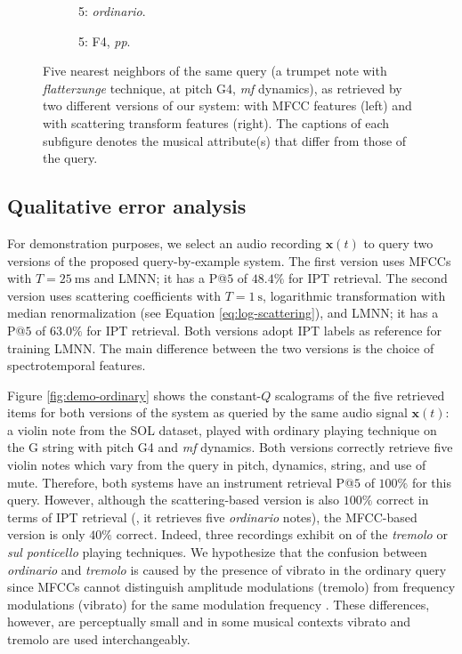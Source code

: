 \begin{figure}
        \begin{subfigure}{0.20\textwidth}
                \centering
                \caption*{5: \emph{ordinario}.}
                \label{fig:TpC-ord-G4-mf}
        \end{subfigure}%
        \begin{subfigure}{0.20\textwidth}
                \centering
                \caption*{5: F4, \emph{pp}.}
                \label{fig:TpC-flatt-F4-pp}
        \end{subfigure}%

        \caption{Five nearest neighbors of the same query (a trumpet note with \emph{flatterzunge} technique, at pitch G4, \emph{mf} dynamics), as retrieved by two different versions of our system: with MFCC features (left) and with scattering transform features (right).%
The captions of each subfigure denotes the musical attribute(s) that differ from those of the query.
}\label{fig:demo-extended}
\end{figure}

\subsection{Qualitative error analysis}
For demonstration purposes, we select an audio recording $\boldsymbol{x}(t)$ to query two versions of the proposed query-by-example system.
The first version uses MFCCs with $T=\SI{25}{\milli\second}$ and LMNN; it has a P@$5$ of $48.4\%$ for IPT retrieval.
The second version uses scattering coefficients with $T=\SI{1}{\second}$, logarithmic transformation with median renormalization (see Equation \ref{eq:log-scattering}), and LMNN; it has a P@$5$ of $63.0\%$ for IPT retrieval.
Both versions adopt IPT labels as reference for training LMNN.
The main difference between the two versions is the choice of spectrotemporal features.

Figure \ref{fig:demo-ordinary} shows the constant-$Q$ scalograms of the five retrieved items for both versions of the system as queried by the same audio signal $\boldsymbol{x}(t)$: a violin note from the SOL dataset, played with ordinary playing technique on the G string with pitch G4 and \emph{mf} dynamics.
Both versions correctly retrieve five violin notes which vary from the query in pitch, dynamics, string, and use of mute.
Therefore, both systems have an instrument retrieval P@$5$ of $100\%$ for this query.
However, although the scattering-based version is also $100\%$ correct in terms of IPT retrieval (\ie{}, it retrieves five \emph{ordinario} notes), the MFCC-based version is only $40\%$ correct.
Indeed, three recordings exhibit on of the \emph{tremolo} or \emph{sul ponticello} playing techniques.
We hypothesize that the confusion between \emph{ordinario} and \emph{tremolo} is caused by the presence of vibrato in the ordinary query since MFCCs cannot distinguish amplitude modulations (tremolo) from frequency modulations (vibrato) for the same modulation frequency \cite{anden2012dafx}.
These differences, however, are perceptually small and in some musical contexts vibrato and tremolo are used interchangeably.

